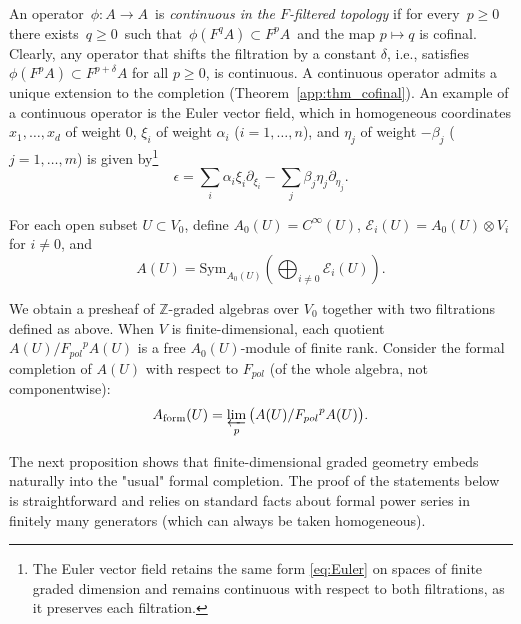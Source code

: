 \documentclass[a4paper,12pt]{amsart}
\newcommand{\cE}{{\mathcal E}}
\newcommand{\Z}{{\mathbb Z}}
\def\e{\epsilon}
\begin{document}
\noindent 
An operator $\, \phi \colon A \to A \,$ is \emph{continuous in the $F$-filtered topology} if for every $\, p \ge 0 \,$ there exists $\, q \ge 0 \,$ such that $\, \phi(F^q A) \subset F^p A \,$ and the map $p \mapsto q$ is cofinal.
Clearly, any operator that shifts the filtration by a constant \(\delta\), i.e., satisfies \(\phi(F^pA)\subset F^{p+\delta}A\) for all \(p\ge 0\), is continuous. A continuous operator admits a unique extension to the completion (Theorem~\ref{app:thm_cofinal}). An example of a continuous operator is the Euler vector field, which in homogeneous coordinates $x_1, \ldots, x_d$ of weight $0$, $\xi_i$ of weight $\alpha_i$ ($i=1, \ldots, n$), and $\eta_j$ of weight $-\beta_j$ ($j=1, \ldots, m$) is given by\footnote{The Euler vector field retains the same form \eqref{eq:Euler} on spaces of finite graded dimension and remains continuous with respect to both filtrations, as it preserves each filtration.
}
\begin{equation}\label{eq:Euler}
\e = \sum_i \alpha_i \xi_i \partial_{\xi_i} - \sum_j \beta_j\eta_j \partial_{\eta_j}.
\end{equation}

\noindent For each open subset $U \subset V_0$, define $A_0(U) = C^\infty(U)$, $\cE_i (U) = A_0 (U) \otimes V_i$ for $i \neq 0$, and
\begin{equation}
A(U) = \mathrm{Sym}_{A_0(U)} \left( \bigoplus_{i \neq 0} \cE_i (U)\right).
\end{equation}

\noindent We obtain a presheaf of $\Z$-graded algebras over $V_0$ together with two filtrations defined as above. When $V$ is finite-dimensional, each quotient $A(U)/{F_{pol}}^p A(U)$ is a free $A_0(U)$-module of finite rank. Consider the formal completion of $A(U)$ with respect to ${F_{pol}}$ (of the whole algebra, not componentwise):
\[
A_{\mathrm{form}}(U) = \varprojlim_p \big(A(U)/{F_{pol}}^p A(U)\big).
\]

\noindent The next proposition shows that finite-dimensional graded geometry embeds naturally into the "usual" formal completion. The proof of the statements below is straightforward and relies on standard facts about formal power series in finitely many generators (which can always be taken homogeneous).
\end{document}
